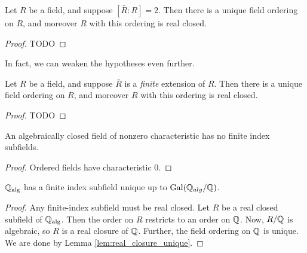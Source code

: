 \begin{theorem}
  \label{thm:Artin-Schreier_weak}
  Let $R$ be a field, and suppose $[\bar{R}:R]=2$. Then there is a unique field ordering on $R$, and moreover $R$ with this ordering is real closed.
\end{theorem}
\begin{proof}
  TODO
\end{proof}

In fact, we can weaken the hypotheses even further.

\begin{theorem}
  \label{thm:Artin-Schreier}
  Let $R$ be a field, and suppose $\bar{R}$ is a \textit{finite} extension of $R$. Then there is a unique field ordering on $R$, and moreover $R$ with this ordering is real closed.
\end{theorem}
\begin{proof}
  TODO
\end{proof}

\begin{corollary}
  An algebraically closed field of nonzero characteristic has no finite index subfields.
\end{corollary}
\begin{proof}
  Ordered fields have characteristic 0.
\end{proof}

\begin{corollary}
  $\mathbb{Q}_\text{alg}$ has a finite index subfield unique up to $\operatorname{Gal}(\mathbb{Q}_{alg}/\mathbb{Q})$.
\end{corollary}
\begin{proof}
  Any finite-index subfield must be real closed. Let $R$ be a real closed subfield of $\mathbb{Q}_\text{alg}$. Then the order on $R$ restricts to an order on $\mathbb{Q}$. Now, $R/\mathbb{Q}$ is algebraic, so $R$ is a real closure of $\mathbb{Q}$. Further, the field ordering on $\mathbb{Q}$ is unique. We are done by Lemma \ref{lem:real_closure_unique}.
\end{proof}